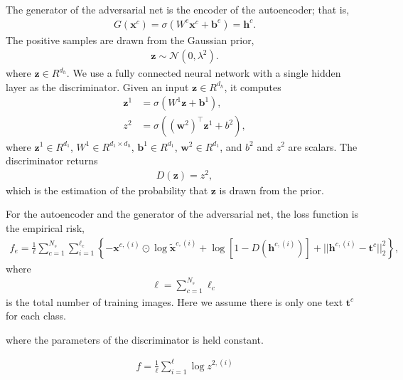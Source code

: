 \documentclass{article}
\newcommand{\bb}[1]{\boldsymbol{#1}}
\begin{document}
	The generator of the adversarial net is the encoder of the autoencoder; that is,
	\begin{align}
		G(\bb{x}^c) = \sigma(W^e \bb{x}^c + \bb{b}^e) = \bb{h}^c.
	\end{align}
	The positive samples are drawn from the Gaussian prior,
	\begin{align}
		\bb{z} \sim \mathcal{N}(0, \lambda^2).
	\end{align}
	where $\bb{z} \in R^{d_h}$.	We use a fully connected neural network with a single hidden layer as the discriminator. Given an input $\bb{z} \in R^{d_h}$, it computes
	\begin{align}
		\bb{z}^1 &= \sigma( W^1 \bb{z} + \bb{b}^1 ), \\
		z^2 &= \sigma( (\bb{w}^2)^{\top} \bb{z}^1 + b^2 ),
	\end{align}
	where $\bb{z}^1 \in R^{d_1}$, $W^1 \in R^{d_1 \times d_h}$, $\bb{b}^1 \in R^{d_1}$, $\bb{w}^2 \in R^{d_1}$, and $b^2$ and $z^2$ are scalars. The discriminator returns
	\begin{align}
		D(\bb{z}) = z^2,
	\end{align}
	which is the estimation of the probability that $\bb{z}$ is drawn from the prior.
	
	For the autoencoder and the generator of the adversarial net, the loss function is the empirical risk,
	\begin{align}
		f_e = \frac{1}{\ell} \sum_{c = 1}^{N_s} \sum_{i = 1}^{\ell_c} \left\{ -\bb{x}^{c, (i)} \odot \log \tilde{\bb{x}}^{c, (i)} + \log\left[ 1 - D( \bb{h}^{c, (i)} ) \right] + || \bb{h}^{c, (i)} - \bb{t}^c ||_2^2 \right\},
	\end{align}
	where
	\begin{align}
		\ell = \sum_{c = 1}^{N_s} \ell_c
	\end{align}
	is the total number of training images. Here we assume there is only one text $\bb{t}^c$ for each class.





	where the parameters of the discriminator is held constant.
	
	
	
	
	\begin{align}
		f = \frac{1}{\ell} \sum_{i = 1}^{\ell} \log z^{2, (i)}
	\end{align}









%
%
\end{document}
